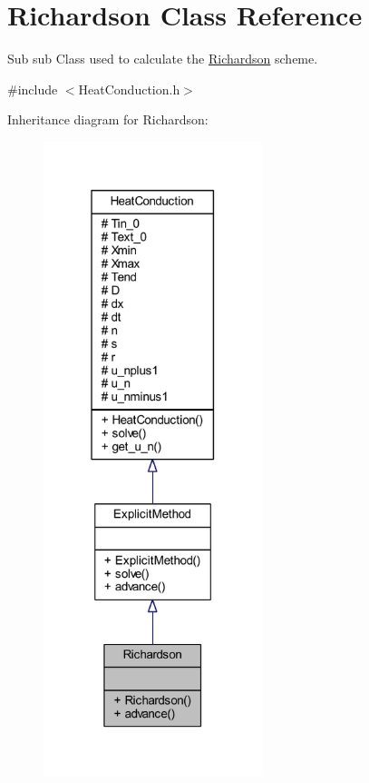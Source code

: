 \hypertarget{class_richardson}{}\section{Richardson Class Reference}
\label{class_richardson}


Sub sub Class used to calculate the \hyperlink{class_richardson}{Richardson} scheme.  




{\ttfamily \#include $<$Heat\+Conduction.\+h$>$}



Inheritance diagram for Richardson\+:
\nopagebreak
\begin{figure}[H]
\begin{center}
\leavevmode
\includegraphics[width=181pt]{class_richardson__inherit__graph}
\end{center}
\end{figure}


